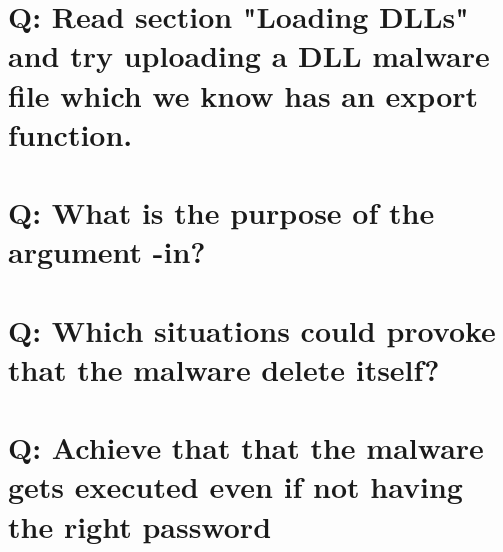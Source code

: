 \documentclass[10pt,a4paper]{article} %
\begin{document}




    \section{Q: Read section "Loading DLLs" and try uploading a DLL malware
    file which we know has an export function.}









    \section{Q: What is the purpose of the argument -in?}




    \section{Q: Which situations could provoke that the malware delete itself?}




    \section{Q: Achieve that that the malware gets executed even if not having
    the right password}






    \nocite{*}
    
    
\end{document}
